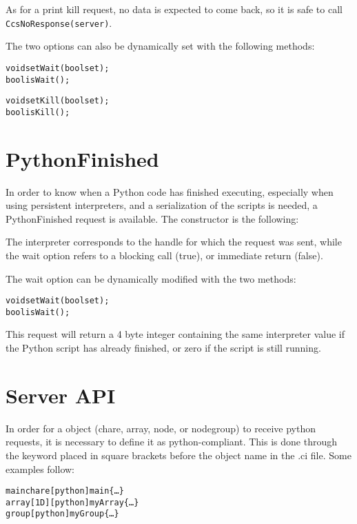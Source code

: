 As for a print kill request, no data is expected to come back, so it is safe to
call \texttt{CcsNoResponse(server)}.

The two options can also be dynamically set with the following methods:

\begin{alltt}
void setWait(bool set);
bool isWait();

void setKill(bool set);
bool isKill();
\end{alltt}

\section{PythonFinished}
\label{pythonFinished}

In order to know when a Python code has finished executing, especially when
using persistent interpreters, and a serialization of the scripts is needed, a
PythonFinished request is available. The constructor is the following:


The interpreter corresponds to the handle for which the request was sent, while
the wait option refers to a blocking call (true), or immediate return (false).

The wait option can be dynamically modified with the two methods:

\begin{alltt}
void setWait(bool set);
bool isWait();
\end{alltt}

This request will return a 4 byte integer containing the same interpreter value
if the Python script has already finished, or zero if the script is still
running.

\section{Server API}
\label{pythonServer}

In order for a \charmpp{} object (chare, array, node, or nodegroup) to receive
python requests, it is necessary to define it as python-compliant. This is done
through the keyword  placed in square brackets before the object name
in the .ci file. Some examples follow:

\begin{alltt}
mainchare [python] main \{\ldots\}
array [1D] [python] myArray \{\ldots\}
group [python] myGroup \{\ldots\}
\end{alltt}

